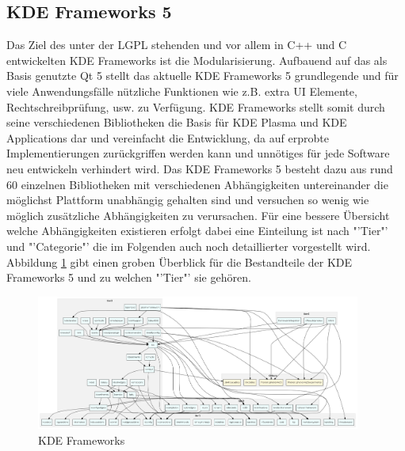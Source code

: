\documentclass[10pt,a4paper,twocolumn]{article}
\begin{document}
\subsection{KDE Frameworks 5}
Das Ziel des unter der LGPL stehenden und vor allem in C++ und C entwickelten KDE Frameworks ist die Modularisierung. Aufbauend auf das als Basis genutzte Qt 5 stellt das aktuelle KDE Frameworks 5 grundlegende und für viele Anwendungsfälle nützliche Funktionen wie z.B. extra UI Elemente, Rechtschreibprüfung, usw. zu Verfügung. KDE Frameworks stellt somit durch seine verschiedenen Bibliotheken die Basis für KDE Plasma und KDE Applications dar und vereinfacht die Entwicklung, da auf erprobte Implementierungen zurückgriffen werden kann und unnötiges für jede Software neu entwickeln verhindert wird. Das KDE Frameworks 5 besteht dazu aus rund 60 einzelnen Bibliotheken mit verschiedenen Abhängigkeiten untereinander die möglichst Plattform unabhängig gehalten sind und versuchen so wenig wie möglich zusätzliche Abhängigkeiten zu verursachen. Für eine bessere Übersicht welche Abhängigkeiten existieren erfolgt dabei eine Einteilung ist nach "'Tier"' und "'Categorie"' die im Folgenden auch noch detaillierter vorgestellt wird. Abbildung \ref{fig:kde_frameworks} gibt einen groben Überblick für die Bestandteile der KDE Frameworks 5 und zu welchen "'Tier"' sie gehören.

\begin{figure}[h]
	\centering
	\includegraphics[width=0.95\textwidth]{images/kf5_big_0.png}
	\caption{KDE Frameworks}
	\label{fig:kde_frameworks}
\end{figure}
\end{document}
